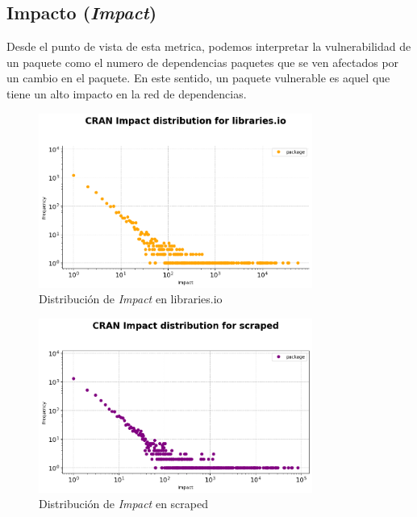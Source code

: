 \subsection{Impacto (\textit{Impact})}

Desde el punto de vista de esta metrica, podemos interpretar la vulnerabilidad de un paquete como el numero
de dependencias paquetes que se ven afectados por un cambio en el paquete. En este sentido, un paquete
vulnerable es aquel que tiene un alto impacto en la red de dependencias.

\begin{figure}[h!]
    \begin{center}
        \includegraphics[width=0.8\textwidth]{img/cran/impact_dist_libio.png}
        \caption{Distribución de \textit{Impact} en libraries.io}
        \label{fig:Distribución de Impact en libraries.io}
    \end{center}
\end{figure}

\begin{figure}[h!]
    \begin{center}
        \includegraphics[width=0.8\textwidth]{img/cran/impact_dist_scraped.png}
        \caption{Distribución de \textit{Impact} en scraped}
        \label{fig:Distribución de Impact en scraped}
    \end{center}
\end{figure}


